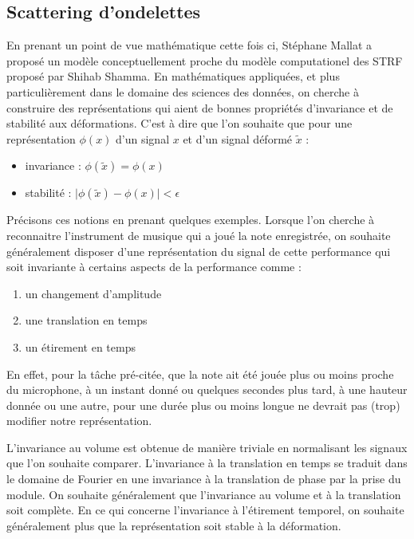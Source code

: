 \subsection{Scattering d'ondelettes}  \label{sec:scattering}

En prenant un point de vue mathématique cette fois ci, Stéphane Mallat a proposé un modèle conceptuellement proche du modèle computationel des STRF proposé par Shihab Shamma. En mathématiques appliquées, et plus particulièrement dans le domaine des sciences des données, on cherche à construire des représentations qui aient de bonnes propriétés d'invariance et de stabilité aux déformations. C'est à dire que l'on souhaite que pour une représentation $\phi(x)$ d'un signal $x$ et d'un signal déformé $\tilde x$ :
\begin{itemize}
  \item invariance : $\phi(\tilde x) = \phi(x)$
  \item stabilité : $ \vert \phi(\tilde x) - \phi(x) | < \epsilon $
\end{itemize}

Précisons ces notions en prenant quelques exemples. Lorsque l'on cherche à reconnaitre l'instrument de musique qui a joué la note enregistrée, on souhaite généralement disposer d'une représentation du signal de cette performance qui soit invariante à certains aspects de la performance comme :
\begin{enumerate}
  \item un changement d'amplitude
  \item une translation en temps
  \item un étirement en temps
\end{enumerate}
En effet, pour la tâche pré-citée, que la note ait été jouée plus ou moins proche du microphone, à un instant donné ou quelques secondes plus tard, à une hauteur donnée ou une autre, pour une durée plus ou moins longue ne devrait pas (trop) modifier notre représentation.

L'invariance au volume est obtenue de manière triviale en normalisant les signaux que l'on souhaite comparer. L'invariance à la translation en temps se traduit dans le domaine de Fourier en une invariance à la translation de phase par la prise du module. On souhaite généralement que l'invariance au volume et à la translation soit complète. En ce qui concerne l'invariance à l'étirement temporel, on souhaite généralement plus que la représentation soit stable à la déformation.

